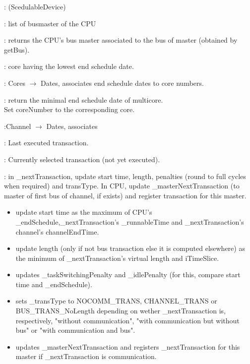 \documentclass[a4paper,11pt]{article}
\newcommand{\bfont}{\fontseries{b}\selectfont}
\newcommand{\cod}[1]{{\ttfamily #1}}
\newcommand{\class}[2]{\par\vspace{1mm}\hspace{-5mm}\large\colorbox{file}{\textbullet\bfont\cod{#1}:} (\cod{#2})\par}
\newcommand{\method}[1]{\par\vspace{1mm}\hspace{-2mm}\colorbox{method}{\textopenbullet\bfont\cod{#1}:}}
\newcommand{\variable}[1]{\par\vspace{1mm}\hspace{-2mm}\colorbox{variable}{\textopenbullet\bfont\cod{#1}:}}
\begin{document}
\class{MultiCoreCPU}{ScedulableDevice}

\variable{\_busMasterList} list of busmaster of the CPU

\method{getMasterForBus(master)} returns the CPU's bus master associated to the bus of master (obtained by getBus).
\variable{coreNumber} core having the lowest end schedule date.

\variable{multicore} {\ttfamily Cores $\rightarrow$ Dates}, associates end schedule dates to core numbers.

\method{getMinEndSchedule} return the minimal end schedule date of \cod{multicore}.\\ Set \cod{coreNumber} to the corresponding core.

\variable{channelEndTime}{\ttfamily Channel $\rightarrow$ Dates}, associates

\variable{\_lastTransaction} Last executed transaction.

\variable{\_nextTransaction} Currently selected transaction (not yet executed).

\method{calcStartTimeLength(iTimeSlice)} in \cod{\_nextTransaction}, update start time, length, penalties (round to full cycles when required) and transType. In CPU, update \cod{\_masterNextTransac\-tion} (to master of first bus of channel, if exists) and register transaction for this master. 
\begin{itemize}
	\item update start time as the maximum of CPU's \cod{\_endSchedule},\cod{\_nextTransaction}'s \cod{\_runnableTime} and \cod{\_nextTransaction}'s channel's \cod{channelEndTime}.
	\item update length (only if not bus transaction else it is computed elsewhere) as the minimum of \cod{\_nextTransaction}'s virtual length and \cod{iTimeSlice}.
	\item updates \cod{\_taskSwitchingPenalty} and \cod{\_idlePenalty} (for this, compare start time and \cod{\_endSchedule}).
	\item sets \cod{\_transType} to \cod{NOCOMM\_TRANS}, \cod{CHANNEL\_TRANS} or \cod{BUS\_TRANS\_NoLength} depending on wether \cod{\_nextTransaction} is, respectively, "without communication", "with communication but without bus" or "with communication and bus".
	\item updates \cod{\_masterNextTransaction} and registers \cod{\_nextTransaction} for this master if \cod{\_nextTransaction} is communication. 
\end{itemize}
\end{document}
